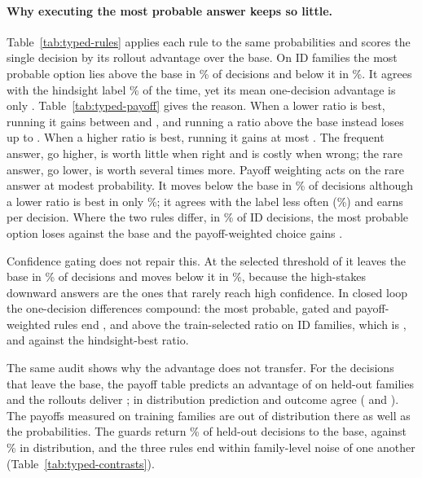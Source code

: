 \documentclass[10pt]{article}
\begin{document}
\paragraph{Why executing the most probable answer keeps so little.}
Table~\ref{tab:typed-rules} applies each rule to the same probabilities and scores the single decision by its rollout advantage over the base. On ID families the most probable option lies above the base in \TypedAuditIdRuleMapAbove\% of decisions and below it in \TypedAuditIdRuleMapBelow\%. It agrees with the hindsight label \TypedAuditIdRuleMapMatches\% of the time, yet its mean one-decision advantage is only \TypedAuditIdRuleMapAdvantage{}. Table~\ref{tab:typed-payoff} gives the reason. When a lower ratio is best, running it gains between \TypedAuditPayoffDownRightMin{} and \TypedAuditPayoffDownRightMax{}, and running a ratio above the base instead loses up to \TypedAuditPayoffOvershootMin{}. When a higher ratio is best, running it gains at most \TypedAuditPayoffUpRightMax{}. The frequent answer, go higher, is worth little when right and is costly when wrong; the rare answer, go lower, is worth several times more. Payoff weighting acts on the rare answer at modest probability. It moves below the base in \TypedAuditIdRuleBayesBelow\% of decisions although a lower ratio is best in only \TypedAuditIdRuleBestBelow\%; it agrees with the label less often (\TypedAuditIdRuleBayesMatches\%) and earns \TypedAuditIdRuleBayesAdvantage{} per decision. Where the two rules differ, in \TypedAuditIdRulesDiffer\% of ID decisions, the most probable option loses \TypedAuditIdDifferMap{} against the base and the payoff-weighted choice gains \TypedAuditIdDifferBayes{}.

Confidence gating does not repair this. At the selected threshold of \TypedAuditThreshold{} it leaves the base in \TypedAuditIdRuleGatedLeaves\% of decisions and moves below it in \TypedAuditIdRuleGatedBelow\%, because the high-stakes downward answers are the ones that rarely reach high confidence. In closed loop the one-decision differences compound: the most probable, gated and payoff-weighted rules end \TypedAuditIdMapVsTrain{}, \TypedAuditIdGatedVsTrain{} and \TypedAuditIdBayesVsTrain{} above the train-selected ratio on ID families, which is \TypedIdMapVsBest{}, \TypedIdGatedVsBest{} and \TypedIdBayesVsBest{} against the hindsight-best ratio.

The same audit shows why the advantage does not transfer. For the decisions that leave the base, the payoff table predicts an advantage of \TypedAuditOodPredicted{} on held-out families and the rollouts deliver \TypedAuditOodRealised{}; in distribution prediction and outcome agree (\TypedAuditIdPredicted{} and \TypedAuditIdRealised{}). The payoffs measured on training families are out of distribution there as well as the probabilities. The guards return \TypedAuditOodGuardBlocks\% of held-out decisions to the base, against \TypedAuditIdGuardBlocks\% in distribution, and the three rules end within family-level noise of one another (Table~\ref{tab:typed-contrasts}).
\end{document}
